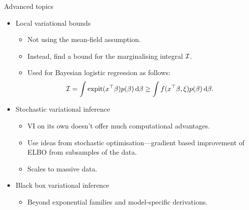 \begin{frame}{Advanced topics}
  \begin{itemize}
    \item Local variational bounds 
    \begin{itemize}
      \item Not using the mean-field assumption.
      \item Instead, find a bound for the marginalising integral ${\mathcal I}$.
      \item Used for Bayesian logistic regression as follows:
      \[
        {\mathcal I} = \int \operatorname{expit}(x^\top\beta) p(\beta) \, \text{d}\beta \geq \int f(x^\top\beta,\xi) p(\beta) \, \text{d}\beta.
      \]
    \end{itemize}
    \item Stochastic variational inference
    \begin{itemize}
      \item VI on its own doesn't offer much computational advantages.
      \item Use ideas from stochastic optimisation---gradient based improvement of ELBO from subsamples of the data.
      \item Scales to massive data.
    \end{itemize}
    \item Black box variational inference
    \begin{itemize}
      \item Beyond exponential families and model-specific derivations.
    \end{itemize}
  \end{itemize}
\end{frame}